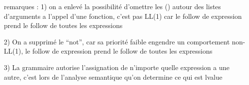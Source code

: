 \documentclass[a4paper,10pt]{article}
\begin{document}
remarques : 
1) on a enlevé la possibilité d'omettre les () autour des listes d'arguments a
l'appel d'une fonction, c'est pas LL(1) car le follow de expression prend le
follow de toutes les expressions

2) On a supprimé le ``not'', car sa priorité faible engendre un comportement
non-LL(1), le follow de expression prend le follow de toutes les expressions

3) La grammaire autorise l'assignation de n'importe quelle expression a une
autre, c'est lors de l'analyse semantique qu'on determine ce qui est lvalue
\end{document}
